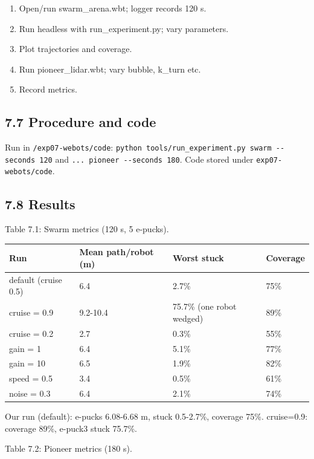\documentclass[
]{article}
\newcounter{none} %
\providecommand{\tightlist}{%
  \setlength{\itemsep}{0pt}\setlength{\parskip}{0pt}}
\begin{document}
\begin{enumerate}
\def\labelenumi{\arabic{enumi}.}
\tightlist
\item
  Open/run swarm\_arena.wbt; logger records 120 s.
\item
  Run headless with run\_experiment.py; vary parameters.
\item
  Plot trajectories and coverage.
\item
  Run pioneer\_lidar.wbt; vary bubble, k\_turn etc.
\item
  Record metrics.
\end{enumerate}

\subsection{7.7 Procedure and code}\label{procedure-and-code-6}

Run in \texttt{/exp07-webots/code}:
\texttt{python\ tools/run\_experiment.py\ swarm\ -\/-seconds\ 120} and
\texttt{...\ pioneer\ -\/-seconds\ 180}. Code stored under
\texttt{exp07-webots/code}.

\subsection{7.8 Results}\label{results-6}

Table 7.1: Swarm metrics (120 s, 5 e-pucks).

{\def\LTcaptype{none} %
\begin{longtable}[]{@{}llll@{}}
\toprule\noalign{}
Run & Mean path/robot (m) & Worst stuck & Coverage \\
\midrule\noalign{}
\endhead
\bottomrule\noalign{}
\endlastfoot
default (cruise 0.5) & 6.4 & 2.7\% & 75\% \\
cruise = 0.9 & 9.2-10.4 & 75.7\% (one robot wedged) & 89\% \\
cruise = 0.2 & 2.7 & 0.3\% & 55\% \\
gain = 1 & 6.4 & 5.1\% & 77\% \\
gain = 10 & 6.5 & 1.9\% & 82\% \\
speed = 0.5 & 3.4 & 0.5\% & 61\% \\
noise = 0.3 & 6.4 & 2.1\% & 74\% \\
\end{longtable}
}

Our run (default): e-pucks 6.08-6.68 m, stuck 0.5-2.7\%, coverage 75\%.
cruise=0.9: coverage 89\%, e-puck3 stuck 75.7\%.

Table 7.2: Pioneer metrics (180 s).
\end{document}
